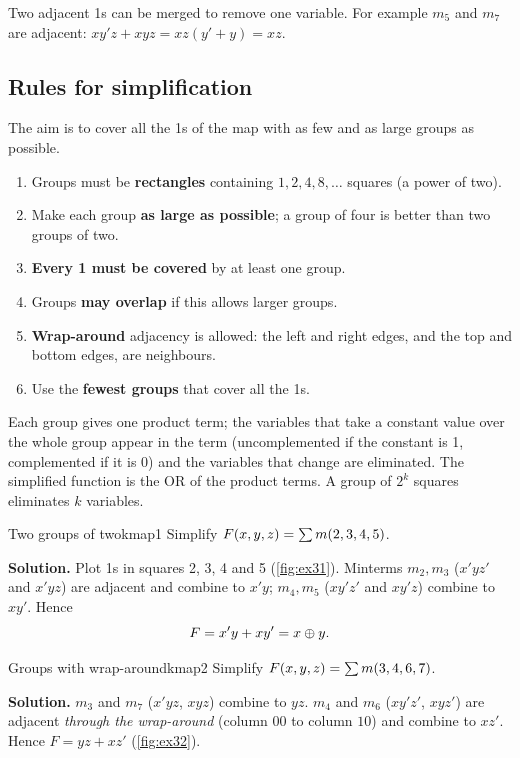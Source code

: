 Two adjacent 1s can be merged to remove one variable. For example $m_5$ and $m_7$ are adjacent: $xy'z + xyz = xz(y'+y) = xz$.


\subsection{Rules for simplification}
\begin{keypoint}
The aim is to cover all the 1s of the map with as few and as large groups as possible.
\begin{enumerate}
  \item Groups must be \textbf{rectangles} containing $1, 2, 4, 8,\dots$ squares (a power of two).
  \item Make each group \textbf{as large as possible}; a group of four is better than two groups of two.
  \item \textbf{Every 1 must be covered} by at least one group.
  \item Groups \textbf{may overlap} if this allows larger groups.
  \item \textbf{Wrap-around} adjacency is allowed: the left and right edges, and the top and bottom edges, are neighbours.
  \item Use the \textbf{fewest groups} that cover all the 1s.
\end{enumerate}
Each group gives one product term; the variables that take a constant value over the whole group appear in the term (uncomplemented if the constant is 1, complemented if it is 0) and the variables that change are eliminated. The simplified function is the OR of the product terms. A group of $2^k$ squares eliminates $k$ variables.
\end{keypoint}

\begin{example}{Two groups of two}{kmap1}
Simplify $F(x,y,z)=\sum m(2,3,4,5)$.

\textbf{Solution.} Plot 1s in squares 2, 3, 4 and 5 (\cref{fig:ex31}). Minterms $m_2,m_3$ ($x'yz'$ and $x'yz$) are adjacent and combine to $x'y$; $m_4,m_5$ ($xy'z'$ and $xy'z$) combine to $xy'$. Hence
\[ F = x'y + xy' = x\oplus y. \]
\end{example}

\begin{example}{Groups with wrap-around}{kmap2}
Simplify $F(x,y,z)=\sum m(3,4,6,7)$.

\textbf{Solution.} $m_3$ and $m_7$ ($x'yz$, $xyz$) combine to $yz$. $m_4$ and $m_6$ ($xy'z'$, $xyz'$) are adjacent \emph{through the wrap-around} (column $00$ to column $10$) and combine to $xz'$. Hence $F = yz + xz'$ (\cref{fig:ex32}).
\end{example}


